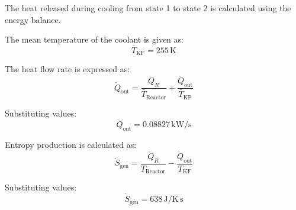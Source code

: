 The heat released during cooling from state 1 to state 2 is calculated using the energy balance.  

The mean temperature of the coolant is given as:  
\[
\bar{T}_{\text{KF}} = 255 \, \text{K}
\]

The heat flow rate is expressed as:  
\[
\dot{Q}_{\text{out}} = \frac{\dot{Q}_R}{\bar{T}_{\text{Reactor}}} + \frac{\dot{Q}_{\text{out}}}{\bar{T}_{\text{KF}}}
\]

Substituting values:  
\[
\dot{Q}_{\text{out}} = 0.08827 \, \text{kW/s}
\]

Entropy production is calculated as:  
\[
\dot{S}_{\text{gen}} = \frac{\dot{Q}_R}{T_{\text{Reactor}}} - \frac{\dot{Q}_{\text{out}}}{T_{\text{KF}}}
\]

Substituting values:  
\[
\dot{S}_{\text{gen}} = 638 \, \text{J/K} \, \text{s}
\]